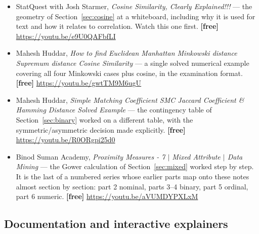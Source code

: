 \documentclass[11pt]{article}
\begin{document}
\begin{itemize}[leftmargin=*]
  \item StatQuest with Josh Starmer, \emph{Cosine Similarity, Clearly
    Explained!!!} --- the geometry of Section~\ref{sec:cosine} at a
    whiteboard, including why it is used for text and how it relates to
    correlation. Watch this one first. \textbf{[free]}
    \url{https://youtu.be/e9U0QAFbfLI}
  \item Mahesh Huddar, \emph{How to find Euclidean Manhattan Minkowski
    distance Supremum distance Cosine Similarity} --- a single solved
    numerical example covering all four Minkowski cases plus cosine, in the
    examination format. \textbf{[free]}
    \url{https://youtu.be/gwtTM9M6ugU}
  \item Mahesh Huddar, \emph{Simple Matching Coefficient SMC Jaccard
    Coefficient \& Hamming Distance Solved Example} --- the contingency table
    of Section~\ref{sec:binary} worked on a different table, with the
    symmetric/asymmetric decision made explicitly. \textbf{[free]}
    \url{https://youtu.be/R0ORgpi25d0}
  \item Binod Suman Academy, \emph{Proximity Measures - 7 $|$ Mixed Attribute
    $|$ Data Mining} --- the Gower calculation of Section~\ref{sec:mixed}
    worked step by step. It is the last of a numbered series whose earlier
    parts map onto these notes almost section by section: part 2 nominal,
    parts 3--4 binary, part 5 ordinal, part 6 numeric. \textbf{[free]}
    \url{https://youtu.be/aVUMDYPXLxM}
\end{itemize}

\subsection*{Documentation and interactive explainers}
\end{document}
